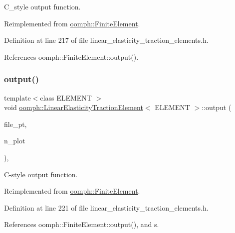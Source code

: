 C\+\_\+style output function. 



Reimplemented from \hyperlink{classoomph_1_1FiniteElement_a72cddd09f8ddbee1a20a1ff404c6943e}{oomph\+::\+Finite\+Element}.



Definition at line 217 of file linear\+\_\+elasticity\+\_\+traction\+\_\+elements.\+h.



References oomph\+::\+Finite\+Element\+::output().

\mbox{\label{classoomph_1_1LinearElasticityTractionElement_a0f06ed03bad8c609bd546ea5e4ebdf6d}} 
\subsubsection{\texorpdfstring{output()}{output()}\hspace{0.1cm}{\footnotesize\ttfamily [4/4]}}
{\footnotesize\ttfamily template$<$class E\+L\+E\+M\+E\+NT $>$ \\
void \hyperlink{classoomph_1_1LinearElasticityTractionElement}{oomph\+::\+Linear\+Elasticity\+Traction\+Element}$<$ E\+L\+E\+M\+E\+NT $>$\+::output (\begin{DoxyParamCaption}\item[{F\+I\+LE $\ast$}]{file\+\_\+pt,  }\item[{const unsigned \&}]{n\+\_\+plot }\end{DoxyParamCaption})\hspace{0.3cm}{\ttfamily [inline]}, {\ttfamily [virtual]}}



C-\/style output function. 



Reimplemented from \hyperlink{classoomph_1_1FiniteElement_adfaee690bb0608f03320eeb9d110d48c}{oomph\+::\+Finite\+Element}.



Definition at line 221 of file linear\+\_\+elasticity\+\_\+traction\+\_\+elements.\+h.



References oomph\+::\+Finite\+Element\+::output(), and s.

